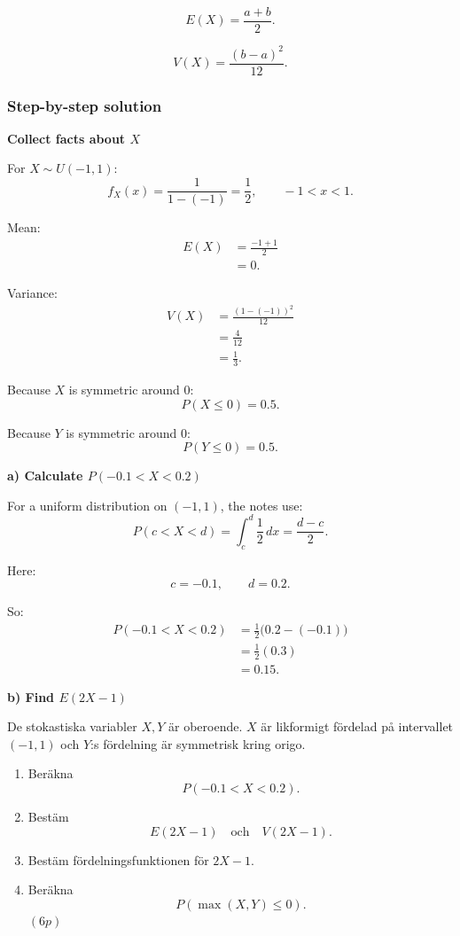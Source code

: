 \documentclass[10pt]{article}
\begin{document}
\[
E(X)=\frac{a+b}{2}.
\]

\[
V(X)=\frac{(b-a)^2}{12}.
\]

\subsubsection*{Step-by-step solution}

\textbf{Collect facts about \(X\)}

For \(X\sim U(-1,1)\):
\[
f_X(x)
=
\frac{1}{1-(-1)}
=
\frac12,
\qquad -1<x<1.
\]

Mean:
\begin{align*}
E(X)
&=
\frac{-1+1}{2}
\\[2mm]
&=0.
\end{align*}

Variance:
\begin{align*}
V(X)
&=
\frac{(1-(-1))^2}{12}
\\[2mm]
&=
\frac{4}{12}
\\[2mm]
&=
\frac13.
\end{align*}

Because \(X\) is symmetric around \(0\):
\[
P(X\le 0)=0.5.
\]

Because \(Y\) is symmetric around \(0\):
\[
P(Y\le 0)=0.5.
\]

\textbf{a) Calculate \(P(-0.1<X<0.2)\)}

For a uniform distribution on \((-1,1)\), the notes
use:
\[
P(c<X<d)
=
\int_c^d \frac12\,dx
=
\frac{d-c}{2}.
\]

Here:
\[
c=-0.1,
\qquad
d=0.2.
\]

So:
\begin{align*}
P(-0.1<X<0.2)
&=
\frac12
\bigl(0.2-(-0.1)\bigr)
\\[2mm]
&=
\frac12(0.3)
\\[2mm]
&=
0.15.
\end{align*}

\textbf{b) Find \(E(2X-1)\)}

De stokastiska variabler \(X,Y\) är oberoende.
\(X\) är likformigt fördelad på intervallet
\((-1,1)\) och \(Y\):s fördelning är symmetrisk
kring origo.

\begin{enumerate}[label=\alph*)]
\item Beräkna
\[
P(-0.1<X<0.2).
\]

\item Bestäm
\[
E(2X-1)
\quad\text{och}\quad
V(2X-1).
\]

\item Bestäm fördelningsfunktionen för \(2X-1\).

\item Beräkna
\[
P(\max(X,Y)\le 0).
\]
\((6p)\)
\end{enumerate}
\end{document}
